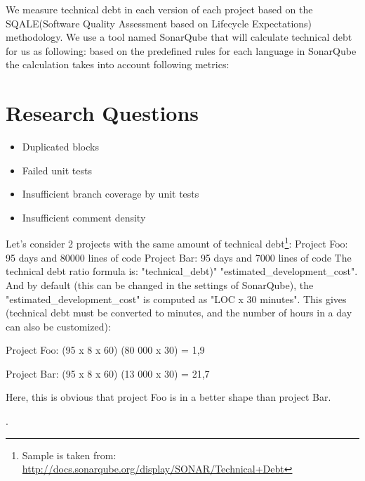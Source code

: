 We measure technical debt in each version of each project based on the SQALE(Software Quality Assessment based on Lifecycle Expectations) methodology. We use a tool named SonarQube that will calculate technical debt for us as following: based on the predefined rules for each language in SonarQube the calculation takes into account following metrics:

	\section{Research Questions}
	\begin{itemize}
		\item Duplicated blocks
		\item  Failed unit tests
		\item Insufficient branch coverage by unit tests
		\item Insufficient comment density
	\end{itemize}

Let's consider 2 projects with the same amount of technical debt\footnote{Sample is taken from: \url{ http://docs.sonarqube.org/display/SONAR/Technical+Debt}}:
Project Foo: 95 days and 80000 lines of code
Project Bar: 95 days and 7000 lines of code
The technical debt ratio formula is: "technical\_debt)" \/ "estimated\_development\_cost". And by default (this can be changed in the settings of SonarQube), the "estimated\_development\_cost" is computed as "LOC x 30 minutes". This gives (technical debt must be converted to minutes, and the number of hours in a day can also be customized):
\par
Project Foo: (95 x 8 x 60) \/ (80 000 x 30) = 1,9%
\par
Project Bar: (95 x 8 x 60) \/ (13 000 x 30) = 21,7%
\par
Here, this is obvious that project Foo is in a better shape than project Bar.

\rqiii.





	
	

